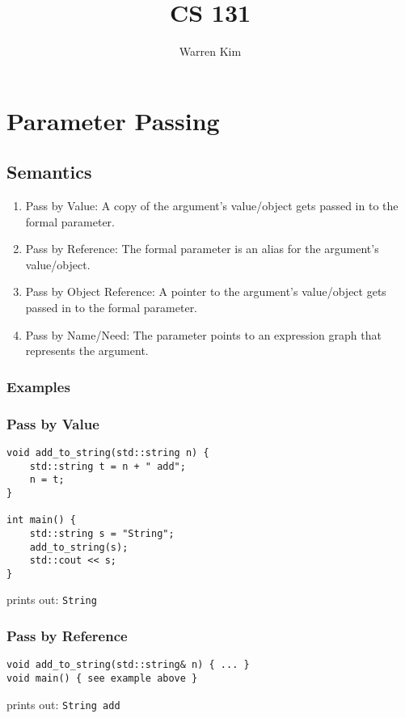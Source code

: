\documentclass{article}
\title{CS 131}
\author{Warren Kim}
\begin{document}
\maketitle

\tableofcontents

\newpage
\section{Parameter Passing}
\subsection{Semantics}
\begin{enumerate}[label=(\roman*)]
\item Pass by Value: A copy of the argument's value/object gets passed
  in to the formal parameter.
\item Pass by Reference: The formal parameter is an alias for the
  argument's value/object.
\item Pass by Object Reference: A pointer to the argument's
  value/object gets passed in to the formal parameter.
\item Pass by Name/Need: The parameter points to an expression graph
  that represents the argument.
\end{enumerate}

\subsubsection{Examples}
\subsubsection*{Pass by Value}
\begin{verbatim}
void add_to_string(std::string n) {
    std::string t = n + " add";
    n = t;
}

int main() {
    std::string s = "String";
    add_to_string(s);
    std::cout << s;
}
\end{verbatim}
prints out: \texttt{String}

\subsubsection*{Pass by Reference}
\begin{verbatim}
void add_to_string(std::string& n) { ... }
void main() { see example above }
\end{verbatim}
prints out: \texttt{String add}
\end{document}
